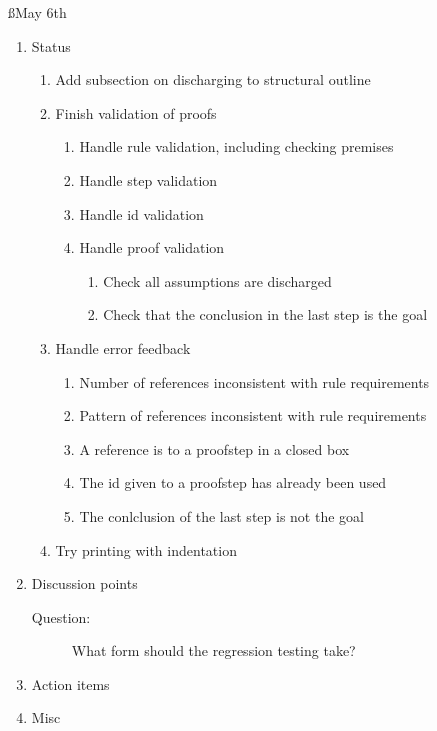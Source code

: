 \documentclass[a4paper]{article}
\begin{document}
\ss{May 6th}
\begin{enumerate}
  \item Status
    \begin{enumerate}[\HollowBox]
      \item Add subsection on discharging to structural outline
      \item Finish validation of proofs
        \begin{enumerate}[\HollowBox]
          \item Handle rule validation, including checking premises
          \item Handle step validation
          \item Handle id validation
          \item Handle proof validation
            \begin{enumerate}[\HollowBox]
              \item Check all assumptions are discharged
              \item Check that the conclusion in the last step is the goal
            \end{enumerate}
        \end{enumerate}
      \item Handle error feedback
        \begin{enumerate}[\HollowBox]
          \item Number of references inconsistent with rule requirements
          \item Pattern of references inconsistent with rule requirements
          \item A reference is to a proofstep in a closed box
          \item The id given to a proofstep has already been used
          \item The conlclusion of the last step is not the goal
        \end{enumerate}
      \item Try printing with indentation
    \end{enumerate}
  \item Discussion points
    \begin{description}
      \item[Question:] What form should the regression testing take?
    \end{description}
  \item Action items
  \item Misc
\end{enumerate}
\end{document}
